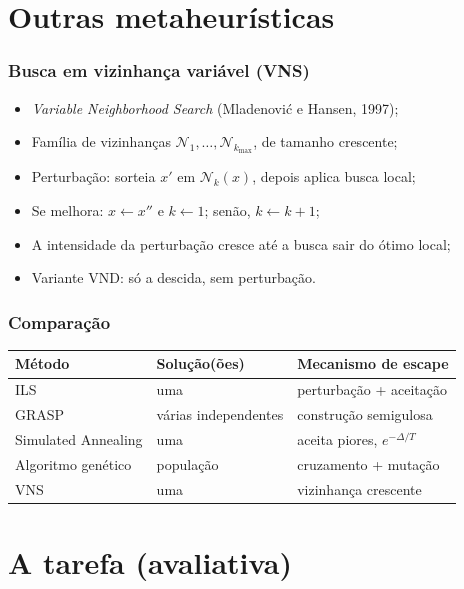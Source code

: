 \documentclass[fleqn]{beamer}
\begin{document}
\section{Outras metaheurísticas}

\begin{frame}
	\frametitle{Busca em vizinhança variável (VNS)}
	\begin{itemize}
		\item \textit{Variable Neighborhood Search} (Mladenović e
			Hansen, 1997);
		\item Família de vizinhanças $\mathcal{N}_1, \ldots,
			\mathcal{N}_{k_{\max}}$, de tamanho crescente;
		\item Perturbação: sorteia $x'$ em $\mathcal{N}_k(x)$, depois
			aplica busca local;
		\item Se melhora: $x \leftarrow x''$ e $k \leftarrow 1$; senão,
			$k \leftarrow k+1$;
		\item A intensidade da perturbação cresce até a busca sair do
			ótimo local;
		\item Variante VND: só a descida, sem perturbação.
	\end{itemize}
\end{frame}

\begin{frame}
	\frametitle{Comparação}
	\begin{center}
	\small
	\begin{tabular}{lll}
		\toprule
		Método & Solução(ões) & Mecanismo de escape \\
		\midrule
		ILS & uma & perturbação + aceitação \\
		GRASP & várias independentes & construção semigulosa \\
		Simulated Annealing & uma & aceita piores, $e^{-\Delta/T}$ \\
		Algoritmo genético & população & cruzamento + mutação \\
		VNS & uma & vizinhança crescente \\
		\bottomrule
	\end{tabular}
	\end{center}
\end{frame}

\section{A tarefa (avaliativa)}
\end{document}

